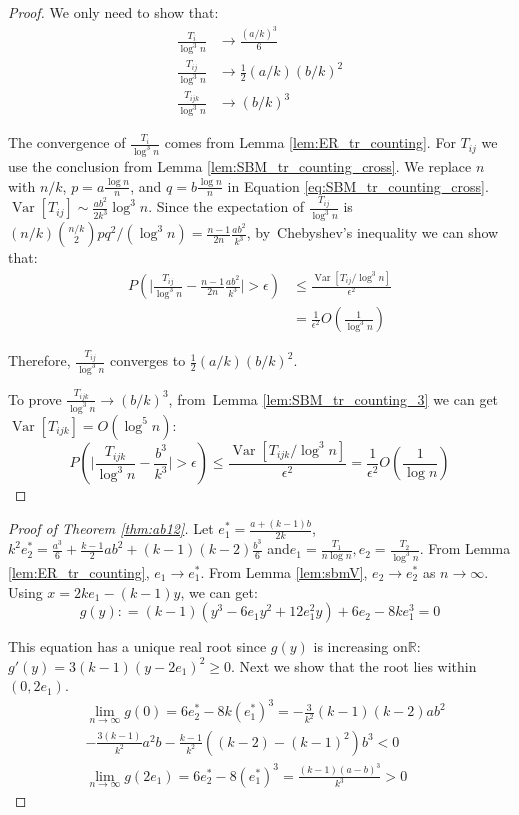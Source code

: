 \documentclass[entropy,article,accept,moreauthors,pdftex]{Definitions/mdpi}
\newcommand{\1}{\mathbbm{1}}
\DeclareMathOperator{\Var}{Var}
\begin{document}
\begin{paracol}{2}
\begin{proof}
	We only need to show that:
\begin{align}
	\frac{T_i}{\log ^3 n} &\to \frac{(a/k)^3}{6} \\
	\frac{T_{ij}}{\log^3 n}& \to \frac{1}{2}(a/k)(b/k)^2\\
	\frac{T_{ijk}}{\log^3 n} & \to (b/k)^3
	\end{align}
	
	The convergence of $\frac{T_i}{\log ^3 n}$ comes from Lemma \ref{lem:ER_tr_counting}.
	For $T_{ij}$ we use the conclusion from Lemma \ref{lem:SBM_tr_counting_cross}.
	We replace $n$ with $n/k$, $p=a\frac{\log n}{n}$, and $q=b\frac{\log n}{n}$ in Equation \eqref{eq:SBM_tr_counting_cross}.\linebreak
	$\Var[T_{ij}] \sim \frac{ab^2}{2k^3} \log^3 n$. Since the expectation of $\frac{T_{ij}}{\log^3 n}$ is $(n/k)\binom{n/k}{2}pq^2/(\log^3 n)
	=\frac{n-1}{2n}\frac{ab^2}{k^3}$, by~Chebyshev's inequality we can show that:
	\begin{align*}
	P( \Big|\frac{T_{ij}}{\log^3 n} - \frac{n-1}{2n}\frac{ab^2}{k^3} \Big| > \epsilon) &\leq \frac{\Var[T_{ij} / \log^3 n]}{\epsilon^2} \\
	& = \frac{1}{\epsilon^2}
	O(\frac{1}{\log^3 n})
	\end{align*}
	
	Therefore, $\frac{T_{ij}}{\log^3 n} $ converges to $\frac{1}{2}(a/k)(b/k)^2$.
	
	To prove $\frac{T_{ijk}}{\log^3 n}\to (b/k)^3$, from~Lemma \ref{lem:SBM_tr_counting_3} we can get $\Var[T_{ijk}] = O(\log^5 n)$:
	$$
	P( \Big|\frac{T_{ijk}}{\log^3 n} -\frac{b^3}{k^3} \Big| > \epsilon) \leq \frac{\Var[T_{ijk} / \log^3 n]}{\epsilon^2} = \frac{1}{\epsilon^2}
	O(\frac{1}{\log n})
	$$
\end{proof}
\begin{proof}[Proof of Theorem \ref{thm:ab12}]
	Let $e^*_1 = \frac{a+(k-1)b}{2k}$, $k^2 e^*_2 = \frac{a^3}{6} + \frac{k-1}{2}ab^2 + (k-1)(k-2)\frac{b^3}{6}$
	and\linebreak $e_1 = \frac{T_1}{n\log n}, e_2 = \frac{T_2}{\log^3 n}$.
	From Lemma \ref{lem:ER_tr_counting}, $e_1 \to e^*_1$.
	From Lemma \ref{lem:sbmV}, $e_2 \to e^*_2$ as $n\to \infty$.
	Using $x=2ke_1 - (k-1)y$, we can get:
\begin{equation}
g(y): = (k-1)(y^3 - 6 e_1 y^2 + 12 e_1^2 y) + 6 e_2 - 8 k e_1^3 = 0
\end{equation}

This equation has a unique real root since $g(y)$ is increasing on\linebreak $\mathbb{R}$:  $g'(y) = 3(k-1)(y-2e_1)^2 \geq 0 $.
Next we show that the root lies within $(0, 2e_1)$.
\begin{align*}
&\lim_{n\to \infty}g(0) =  6e^*_2 - 8k(e^*_1)^3 =-\frac{3}{k^2}(k-1)(k-2)ab^2 \\
&-\frac{3(k-1)}{k^2}a^2b - \frac{k-1}{k^2} ((k-2)-(k-1)^2)b^3 < 0 \\
&\lim_{n\to \infty}g(2e_1) = 6e^*_2 - 8(e^*_1)^3 = \frac{(k-1)(a-b)^3}{k^3} > 0
\end{align*}


\end{proof}
\end{paracol}
\end{document}

